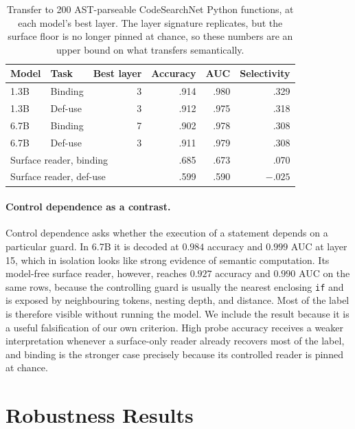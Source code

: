 \documentclass{article}
\begin{document}
\begin{table}[htbp]
\centering
\small
\caption{Transfer to 200 AST-parseable CodeSearchNet Python functions, at each model's best layer. The layer signature replicates, but the surface floor is no longer pinned at chance, so these numbers are an upper bound on what transfers semantically.}
\label{tab:app-csn}
\begin{tabular}{llrrrr}
\toprule
Model & Task & Best layer & Accuracy & AUC & Selectivity \\
\midrule
1.3B & Binding  & 3 & .914 & .980 & .329 \\
1.3B & Def-use  & 3 & .912 & .975 & .318 \\
6.7B & Binding  & 7 & .902 & .978 & .308 \\
6.7B & Def-use  & 3 & .911 & .979 & .308 \\
\midrule
\multicolumn{3}{l}{Surface reader, binding} & .685 & .673 & .070 \\
\multicolumn{3}{l}{Surface reader, def-use} & .599 & .590 & $-.025$ \\
\bottomrule
\end{tabular}
\end{table}

\paragraph{Control dependence as a contrast.}
Control dependence asks whether the execution of a statement depends on a particular guard. In 6.7B it is decoded at $0.984$ accuracy and $0.999$ AUC at layer 15, which in isolation looks like strong evidence of semantic computation. Its model-free surface reader, however, reaches $0.927$ accuracy and $0.990$ AUC on the same rows, because the controlling guard is usually the nearest enclosing \texttt{if} and is exposed by neighbouring tokens, nesting depth, and distance. Most of the label is therefore visible without running the model. We include the result because it is a useful falsification of our own criterion. High probe accuracy receives a weaker interpretation whenever a surface-only reader already recovers most of the label, and binding is the stronger case precisely because its controlled reader is pinned at chance.

\section{Robustness Results}
\label{app:robustness}
\end{document}
